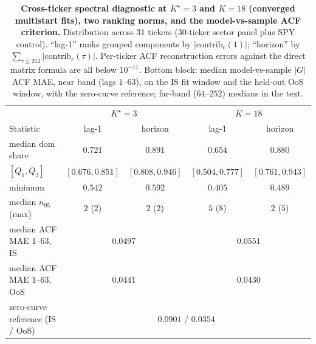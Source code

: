 \begin{table}[H]
\centering
\small
\caption{\textbf{Cross-ticker spectral diagnostic at $K^\star = 3$ and $K = 18$ (converged multistart fits), two ranking norms, and the model-vs-sample ACF criterion.} Distribution across 31 tickers (30-ticker sector panel plus SPY control). ``lag-1'' ranks grouped components by $|\mathrm{contrib}_c(1)|$; ``horizon'' by $\sum_{\tau \le 252} |\mathrm{contrib}_c(\tau)|$. Per-ticker ACF reconstruction errors against the direct matrix formula are all below $10^{-11}$. Bottom block: median model-vs-sample $|G|$ ACF MAE, near band (lags $1$--$63$), on the IS fit window and the held-out OoS window, with the zero-curve reference; far-band ($64$--$252$) medians in the text.}
\label{tab:spectral_xticker}
\begin{tabular}{l c c c c}
\toprule
 & \multicolumn{2}{c}{$K^\star = 3$} & \multicolumn{2}{c}{$K = 18$} \\
Statistic & lag-1 & horizon & lag-1 & horizon \\
\midrule
median dom share      & $0.721$ & $0.891$ & $0.654$ & $0.880$ \\
$[Q_1, Q_3]$          & $[0.676, 0.851]$ & $[0.808, 0.946]$ & $[0.504, 0.777]$ & $[0.761, 0.943]$ \\
minimum               & $0.542$ & $0.592$ & $0.405$ & $0.489$ \\
median $n_{95}$ (max) & $2$ ($2$) & $2$ ($2$) & $5$ ($8$) & $2$ ($5$) \\
\midrule
median ACF MAE $1$--$63$, IS   & \multicolumn{2}{c}{$0.0497$} & \multicolumn{2}{c}{$0.0551$} \\
median ACF MAE $1$--$63$, OoS  & \multicolumn{2}{c}{$0.0441$} & \multicolumn{2}{c}{$0.0430$} \\
zero-curve reference (IS / OoS) & \multicolumn{4}{c}{$0.0901$ / $0.0354$} \\
\bottomrule
\end{tabular}
\end{table}

